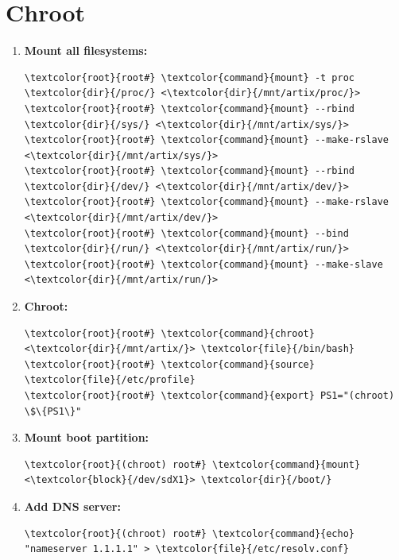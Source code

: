 \documentclass[10pt, a4paper, onecolumn, oneside, titlepage, openany]{book}
\begin{document}
\section{Chroot}
\begin{enumerate}
    \item \textbf{Mount all filesystems:}
\begin{Verbatim}[commandchars=\\\{\}]
\textcolor{root}{root#} \textcolor{command}{mount} -t proc \textcolor{dir}{/proc/} <\textcolor{dir}{/mnt/artix/proc/}>
\textcolor{root}{root#} \textcolor{command}{mount} --rbind \textcolor{dir}{/sys/} <\textcolor{dir}{/mnt/artix/sys/}>
\textcolor{root}{root#} \textcolor{command}{mount} --make-rslave <\textcolor{dir}{/mnt/artix/sys/}>
\textcolor{root}{root#} \textcolor{command}{mount} --rbind \textcolor{dir}{/dev/} <\textcolor{dir}{/mnt/artix/dev/}>
\textcolor{root}{root#} \textcolor{command}{mount} --make-rslave <\textcolor{dir}{/mnt/artix/dev/}>
\textcolor{root}{root#} \textcolor{command}{mount} --bind \textcolor{dir}{/run/} <\textcolor{dir}{/mnt/artix/run/}>
\textcolor{root}{root#} \textcolor{command}{mount} --make-slave <\textcolor{dir}{/mnt/artix/run/}>
\end{Verbatim}
    \item \textbf{Chroot:}
\begin{Verbatim}[commandchars=\\\{\}]
\textcolor{root}{root#} \textcolor{command}{chroot} <\textcolor{dir}{/mnt/artix/}> \textcolor{file}{/bin/bash}
\textcolor{root}{root#} \textcolor{command}{source} \textcolor{file}{/etc/profile}
\textcolor{root}{root#} \textcolor{command}{export} PS1="(chroot) \$\{PS1\}"
\end{Verbatim}
    \item \textbf{Mount boot partition:}
\begin{Verbatim}[commandchars=\\\{\}]
\textcolor{root}{(chroot) root#} \textcolor{command}{mount} <\textcolor{block}{/dev/sdX1}> \textcolor{dir}{/boot/}
\end{Verbatim}
    \item \textbf{Add DNS server:}
\begin{Verbatim}[commandchars=\\\{\}]
\textcolor{root}{(chroot) root#} \textcolor{command}{echo} "nameserver 1.1.1.1" > \textcolor{file}{/etc/resolv.conf}
\end{Verbatim}
\end{enumerate}
\end{document}
